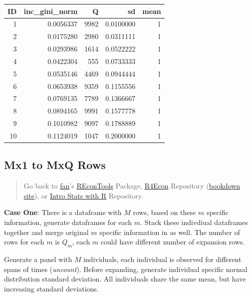 \documentclass[
]{book}
\begin{document}
\begin{table}[!h]
\centering
\begin{tabular}{r|r|r|r|r}
\hline
ID & inc\_gini\_norm & Q & sd & mean\\
\hline
\rowcolor{gray!6}  1 & 0.0056337 & 9982 & 0.0100000 & 1\\
\hline
2 & 0.0175280 & 2980 & 0.0311111 & 1\\
\hline
\rowcolor{gray!6}  3 & 0.0293986 & 1614 & 0.0522222 & 1\\
\hline
4 & 0.0422304 & 555 & 0.0733333 & 1\\
\hline
\rowcolor{gray!6}  5 & 0.0535146 & 4469 & 0.0944444 & 1\\
\hline
6 & 0.0653938 & 9359 & 0.1155556 & 1\\
\hline
\rowcolor{gray!6}  7 & 0.0769135 & 7789 & 0.1366667 & 1\\
\hline
8 & 0.0894165 & 9991 & 0.1577778 & 1\\
\hline
\rowcolor{gray!6}  9 & 0.1010982 & 9097 & 0.1788889 & 1\\
\hline
10 & 0.1124019 & 1047 & 0.2000000 & 1\\
\hline
\end{tabular}
\end{table}

\hypertarget{mx1-to-mxq-rows}{%
\subsection{Mx1 to MxQ Rows}\label{mx1-to-mxq-rows}}

\begin{quote}
Go back to \href{http://fanwangecon.github.io/}{fan}'s \href{https://fanwangecon.github.io/REconTools/}{REconTools} Package, \href{https://fanwangecon.github.io/R4Econ/}{R4Econ} Repository (\href{https://fanwangecon.github.io/R4Econ/bookdown}{bookdown site}), or \href{https://fanwangecon.github.io/Stat4Econ/}{Intro Stats with R} Repository.
\end{quote}

\textbf{Case One}: There is a dataframe with \(M\) rows, based on these \(m\) specific information, generate dataframes for each \(m\). Stack these indivdiual dataframes together and merge original \(m\) specific information in as well. The number of rows for each \(m\) is \(Q_m\), each \(m\) could have different number of expansion rows.

Generate a panel with \(M\) individuals, each individual is observed for different spans of times (\emph{uncount}). Before expanding, generate individual specific normal distribution standard deviation. All individuals share the same mean, but have increasing standard deviations.
\end{document}
